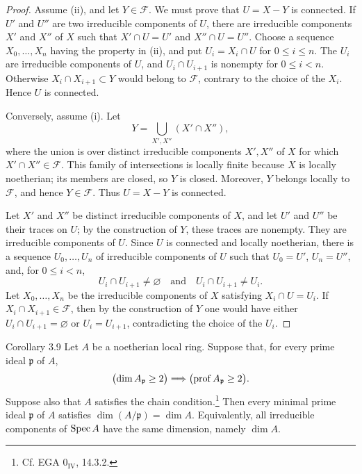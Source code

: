 \begin{proof}
Assume (ii), and let $Y\in\mathcal F$. We must prove that $U=X-Y$ is
connected. If $U'$ and $U''$ are two irreducible components of $U$, there are
irreducible components $X'$ and $X''$ of $X$ such that
$X'\cap U=U'$ and $X''\cap U=U''$. Choose a sequence
$X_0,\ldots,X_n$ having the property in (ii), and put
$U_i=X_i\cap U$ for $0\le i\le n$. The $U_i$ are irreducible components of
$U$, and $U_i\cap U_{i+1}$ is nonempty for $0\le i<n$. Otherwise
$X_i\cap X_{i+1}\subset Y$ would belong to $\mathcal F$, contrary to the
choice of the $X_i$. Hence $U$ is connected.

Conversely, assume (i). Let
\[
  Y=\bigcup_{X',X''}(X'\cap X''),
\]
where the union is over distinct irreducible components $X',X''$ of $X$ for
which $X'\cap X''\in\mathcal F$. This family of intersections is locally
finite because $X$ is locally noetherian; its members are closed, so $Y$ is
closed. Moreover, $Y$ belongs locally to $\mathcal F$, and hence
$Y\in\mathcal F$. Thus $U=X-Y$ is connected.

Let $X'$ and $X''$ be distinct irreducible components of $X$, and let $U'$
and $U''$ be their traces on $U$; by the construction of $Y$, these traces
are nonempty. They are irreducible components of $U$. Since $U$ is connected
and locally noetherian, there is a sequence $U_0,\ldots,U_n$ of irreducible
components of $U$ such that $U_0=U'$, $U_n=U''$, and, for $0\le i<n$,
\[
  U_i\cap U_{i+1}\ne\varnothing
  \quad\text{and}\quad U_i\cap U_{i+1}\ne U_i.
\]
Let $X_0,\ldots,X_n$ be the irreducible components of $X$ satisfying
$X_i\cap U=U_i$. If $X_i\cap X_{i+1}\in\mathcal F$, then by the construction
of $Y$ one would have either $U_i\cap U_{i+1}=\varnothing$ or
$U_i=U_{i+1}$, contradicting the choice of the $U_i$.
\end{proof}


\begin{sgastatement}{Corollary 3.9}
Let $A$ be a noetherian local ring. Suppose that, for every prime ideal
$\mathfrak p$ of $A$,
\[
  \bigl(\dim A_{\mathfrak p}\ge2\bigr)
  \Longrightarrow
  \bigl(\operatorname{prof} A_{\mathfrak p}\ge2\bigr).
\]
Suppose also that $A$ satisfies the chain condition.\footnote{Cf. EGA
$0_{\mathrm{IV}}$, 14.3.2.} Then every minimal prime ideal $\mathfrak p$ of
$A$ satisfies $\dim(A/\mathfrak p)=\dim A$. Equivalently, all irreducible
components of $\operatorname{Spec} A$ have the same dimension, namely $\dim A$.
\end{sgastatement}


